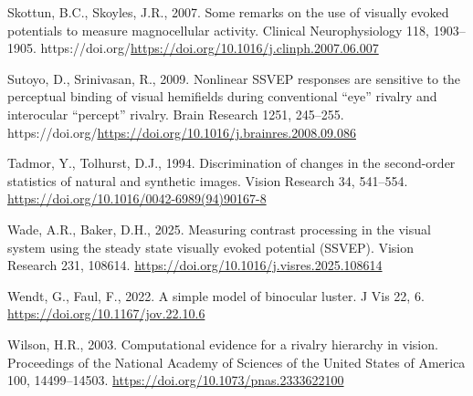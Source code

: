 \documentclass[review,
  12pt,
]{elsarticle}
\newlength{\cslhangindent}
\newenvironment{CSLReferences}[2] %
 {\begin{list}{}{%
  \setlength{\itemindent}{0pt}
  \setlength{\leftmargin}{0pt}
  \setlength{\parsep}{0pt}
  \ifodd #1
   \setlength{\leftmargin}{\cslhangindent}
   \setlength{\itemindent}{-1\cslhangindent}
  \fi
  \setlength{\itemsep}{#2\baselineskip}}}
 {\end{list}}
\begin{document}
\begin{CSLReferences}{1}{0}
Skottun, B.C., Skoyles, J.R., 2007. Some remarks on the use of visually
evoked potentials to measure magnocellular activity. Clinical
Neurophysiology 118, 1903--1905.
https://doi.org/\url{https://doi.org/10.1016/j.clinph.2007.06.007}

Sutoyo, D., Srinivasan, R., 2009. Nonlinear SSVEP responses are
sensitive to the perceptual binding of visual hemifields during
conventional {``eye''} rivalry and interocular {``percept''} rivalry.
Brain Research 1251, 245--255.
https://doi.org/\url{https://doi.org/10.1016/j.brainres.2008.09.086}

Tadmor, Y., Tolhurst, D.J., 1994. Discrimination of changes in the
second-order statistics of natural and synthetic images. Vision Research
34, 541--554. \url{https://doi.org/10.1016/0042-6989(94)90167-8}

Wade, A.R., Baker, D.H., 2025. Measuring contrast processing in the
visual system using the steady state visually evoked potential (SSVEP).
Vision Research 231, 108614.
\url{https://doi.org/10.1016/j.visres.2025.108614}

Wendt, G., Faul, F., 2022. A simple model of binocular luster. J Vis 22,
6. \url{https://doi.org/10.1167/jov.22.10.6}

Wilson, H.R., 2003. Computational evidence for a rivalry hierarchy in
vision. Proceedings of the National Academy of Sciences of the United
States of America 100, 14499--14503.
\url{https://doi.org/10.1073/pnas.2333622100}

\end{CSLReferences}
\end{document}

